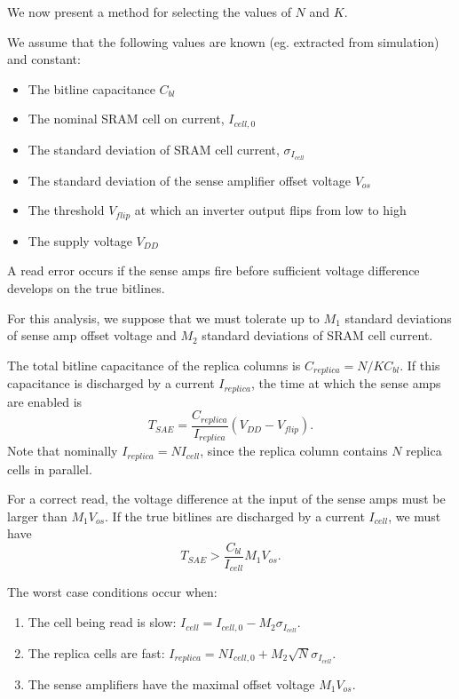 We now present a method for selecting the values of $N$ and $K$.

We assume that the following values are known (eg. extracted from simulation) and constant:
\begin{itemize}
\item The bitline capacitance $C_{bl}$
\item The nominal SRAM cell on current, $I_{cell,0}$
\item The standard deviation of SRAM cell current, $\sigma_{I_{cell}}$
\item The standard deviation of the sense amplifier offset voltage $V_{os}$
\item The threshold $V_{flip}$ at which an inverter output flips from low to high
\item The supply voltage $V_{DD}$
\end{itemize}

A read error occurs if the sense amps fire before sufficient voltage difference develops on the true bitlines.

For this analysis, we suppose that we must tolerate up to $M_1$ standard deviations of sense amp offset voltage
and $M_2$ standard deviations of SRAM cell current.

The total bitline capacitance of the replica columns is $ C_{replica} = N/K C_{bl}. $
If this capacitance is discharged by a current $I_{replica}$, the time at which the sense amps are enabled is
\begin{equation}
T_{SAE} = \frac{C_{replica}}{I_{replica}}\left( V_{DD} - V_{flip} \right).
\end{equation}
Note that nominally $I_{replica} = N I_{cell}$, since the replica column contains $N$ replica cells in parallel.

For a correct read, the voltage difference at the input of the sense amps must be larger than $M_1 V_{os}.$
If the true bitlines are discharged by a current $I_{cell}$, we must have
\begin{equation}
T_{SAE} > \frac{C_{bl}}{I_{cell}} M_1 V_{os}.
\end{equation}

The worst case conditions occur when:
\begin{enumerate}
\item The cell being read is slow: $ I_{cell} = I_{cell,0} - M_2 \sigma_{I_{cell}}. $

\item The replica cells are fast: $ I_{replica} = N I_{cell,0} + M_2 \sqrt{N} \sigma_{I_{cell}}. $

\item The sense amplifiers have the maximal offset voltage $M_1 V_{os}$.
\end{enumerate}

